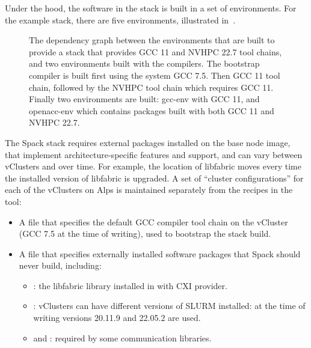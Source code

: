 Under the hood, the software in the stack is built in a set of \spack environments.
For the example stack, there are five environments, illustrated in~.

\begin{figure}[htp!]
    \begin{center}
    
    \end{center}
    \caption{The dependency graph between the \spack environments that are built to provide a \spack stack that provides GCC 11 and NVHPC 22.7 tool chains, and two environments built with the compilers. The bootstrap compiler is built first using the system GCC 7.5. Then GCC 11 tool chain, followed by the NVHPC tool chain which requires GCC 11. Finally two environments are built: gcc-env with GCC 11, and openacc-env which contains packages built with both GCC 11 and NVHPC 22.7.}
    \label{fig:env-dag}
\end{figure}

The Spack stack requires external packages installed on the base node image, that implement architecture-specific features and support, and can vary between vClusters and over time.
For example, the location of libfabric moves every time the installed version of libfabric is upgraded.
A set of ``cluster configurations'' for each of the vClusters on Alps is maintained separately from the recipes in the \stackinator tool:
\begin{itemize}
    \item A \spack {} file that specifies the default GCC compiler tool chain on the vCluster (GCC 7.5 at the time of writing), used to bootstrap the \spack stack build.
    \item A \spack {} file that specifies externally installed software packages that Spack should never build, including:
    \begin{itemize}
        \item {}: the libfabric library installed in  with CXI provider.
        \item {}: vClusters can have different versions of SLURM installed: at the time of writing versions 20.11.9 and 22.05.2 are used.
        \item {} and : required by some communication libraries.
    \end{itemize}
\end{itemize}

